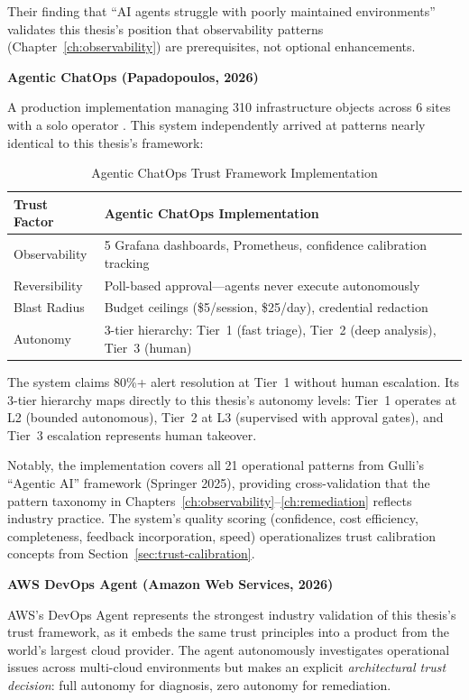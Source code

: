 Their finding that ``AI agents struggle with poorly maintained environments'' validates this thesis's position that observability patterns (Chapter~\ref{ch:observability}) are prerequisites, not optional enhancements.

\textbf{Agentic ChatOps (Papadopoulos, 2026)}

A production implementation managing 310 infrastructure objects across 6 sites with a solo operator \citep{papadopoulos2026chatops}. This system independently arrived at patterns nearly identical to this thesis's framework:

\begin{table}[htbp]
\centering
\caption{Agentic ChatOps Trust Framework Implementation}
\label{tab:agentic-chatops-trust}
\begin{tabular}{ll}
\toprule
\textbf{Trust Factor} & \textbf{Agentic ChatOps Implementation} \\
\midrule
Observability & 5 Grafana dashboards, Prometheus, confidence calibration tracking \\
Reversibility & Poll-based approval---agents never execute autonomously \\
Blast Radius & Budget ceilings (\$5/session, \$25/day), credential redaction \\
Autonomy & 3-tier hierarchy: Tier~1 (fast triage), Tier~2 (deep analysis), Tier~3 (human) \\
\bottomrule
\end{tabular}
\end{table}

The system claims 80\%+ alert resolution at Tier~1 without human escalation. Its 3-tier hierarchy maps directly to this thesis's autonomy levels: Tier~1 operates at L2 (bounded autonomous), Tier~2 at L3 (supervised with approval gates), and Tier~3 escalation represents human takeover.

Notably, the implementation covers all 21 operational patterns from Gulli's ``Agentic AI'' framework (Springer 2025), providing cross-validation that the pattern taxonomy in Chapters~\ref{ch:observability}--\ref{ch:remediation} reflects industry practice. The system's quality scoring (confidence, cost efficiency, completeness, feedback incorporation, speed) operationalizes trust calibration concepts from Section~\ref{sec:trust-calibration}.

\textbf{AWS DevOps Agent (Amazon Web Services, 2026)}

AWS's DevOps Agent \citep{aws2026devopsagent} represents the strongest industry validation of this thesis's trust framework, as it embeds the same trust principles into a product from the world's largest cloud provider. The agent autonomously investigates operational issues across multi-cloud environments but makes an explicit \textit{architectural trust decision}: full autonomy for diagnosis, zero autonomy for remediation.


